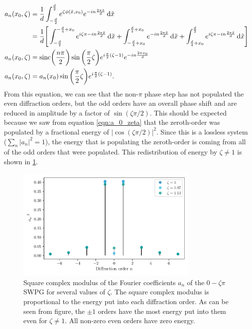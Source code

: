 \begin{equation}
\label{eqn:a_n_zeta}
	\begin{aligned}
	a_n(x_0,\zeta) &= \frac{1}{d}\int_{-\frac{d}{2}}^{\frac{d}{2}} e^{\zeta\phi(\tilde{x},x_0)}e^{-i n \frac{2\pi\tilde{x}}{d}}\mathop{}\!\mathrm{d}\tilde{x}\\
	&= \frac{1}{d}\Bigg[\int_{-\frac{d}{2}}^{-\frac{d}{4}+x_0}e^{i\zeta\pi-i n \frac{2\pi\tilde{x}}{d}} \mathop{}\!\mathrm{d}\tilde{x}
	+ \int_{-\frac{d}{4}+x_0}^{\frac{d}{4}+x_0}e^{-i n \frac{2\pi\tilde{x}}{d}} \mathop{}\!\mathrm{d}\tilde{x}
	+ \int_{\frac{d}{4}+x_0}^{\frac{d}{2}} e^{i\zeta\pi-i n \frac{2\pi\tilde{x}}{d}}\mathop{}\!\mathrm{d}\tilde{x} \Bigg]\\
	a_n(x_0, \zeta) & = \mathrm{sinc}\bigg(\frac{n\pi}{2}\bigg)\sin\bigg(\frac{\pi}{2}\zeta\bigg) e^{i\frac{\pi}{2} (\zeta - 1)} e^{-in\frac{2\pi x_0}{d}}\\
	a_n(x_0,\zeta) &= a_n(x_0)\sin\bigg(\frac{\pi}{2}\zeta\bigg)e^{i\frac{\pi}{2}(\zeta-1)}.
	\end{aligned}
\end{equation} 
From this equation, we can see that the non-$\pi$ phase step has not populated the even diffraction orders, but the odd orders have an overall phase shift and are reduced in amplitude by a factor of $\sin(\zeta\pi/2)$.  This should be expected because we saw from equation \ref{eqn:a_0_zeta} that the zeroth-order was populated by a fractional energy of $\rvert \cos(\zeta\pi/2)\rvert^2$.  Since this is a lossless system ($\sum_{n}\rvert a_n\rvert^2 = 1$), the energy that is populating the zeroth-order is coming from all of the odd orders that were populated. This redistribution of energy by $\zeta\neq1$ is shown in \ref{fig:a_n_zeta}.

\begin{figure}
	\centering
	\includegraphics[width=0.8\textwidth]{figures/Two_source/a_n_zeta.pdf}
	\caption[Square modulus of Fourier coefficients of a $0-\zeta\pi$ SWPG for various $\zeta$]{Square complex modulus of the Fourier coefficients $a_n$ of the $0-\zeta\pi$ SWPG for several values of $\zeta$. The square complex modulus is proportional to the energy put into each diffraction order.  As can be seen from figure, the $\pm1$ orders have the most energy put into them even for $\zeta\neq 1$.  All non-zero even orders have zero energy.}
	\label{fig:a_n_zeta}
\end{figure}

